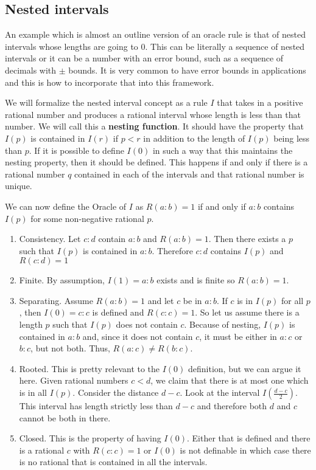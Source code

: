\documentclass[12pt]{article}
\theoremstyle{remark}
\begin{document}
\subsection{Nested intervals}

An example which is almost an outline version of an oracle rule is that of nested intervals whose lengths are going to 0. This can be literally a sequence of nested intervals or it can be a number with an error bound, such as a sequence of decimals with $\pm$ bounds. It is very common to have error bounds in applications and this is how to incorporate that into this framework. 

We will formalize the nested interval concept as a rule $I$ that takes in a positive rational number and produces a rational interval whose length is less than that number. We will call this a \textbf{nesting function}. It should have the property that $I(p)$ is contained in $I(r)$ if $p<r$ in addition to the length of $I(p)$ being less than $p$. If it is possible to define $I(0)$ in such a way that this maintains the nesting property, then it should be defined. This happens if and only if there is a rational number $q$ contained in each of the intervals and that rational number is unique. 

We can now define the Oracle of $I$ as $R(a:b) = 1$ if and only if $a:b$ contains $I(p)$ for some non-negative rational $p$.

\begin{enumerate}
    \item Consistency. Let $c:d$ contain $a:b$ and $R(a:b)=1$. Then there exists a $p$ such that $I(p)$ is contained in $a:b$. Therefore $c:d$ contains $I(p)$ and $R(c:d) = 1$
    \item Finite. By assumption, $I(1)=a:b$ exists and is finite so $R(a:b)=1$.
    \item Separating. Assume $R(a:b)=1$ and let $c$ be in $a:b$. If $c$ is in $I(p)$ for all $p$, then $I(0) = c:c$ is defined and $R(c:c)=1$. So let us assume there is a length $p$ such that $I(p)$ does not contain $c$. Because of nesting, $I(p)$ is contained in $a:b$ and, since it does not contain $c$, it must be either in $a:c$ or $b:c$, but not both. Thus, $R(a:c) \neq R(b:c)$.
    \item Rooted. This is pretty relevant to the $I(0)$ definition, but we can argue it here. Given rational numbers $c < d$, we claim that there is at most one which is in all $I(p)$. Consider the distance $d-c$. Look at the interval $I( \tfrac{d-c}{2} )$. This interval has length strictly less than $d-c$ and therefore both $d$ and $c$ cannot be both in there. 
    \item Closed. This is the property of having $I(0)$. Either that is defined and there is a rational $c$ with $R(c:c)=1$ or $I(0)$ is not definable in which case there is no rational that is contained in all the intervals. 
\end{enumerate}
\end{document}
